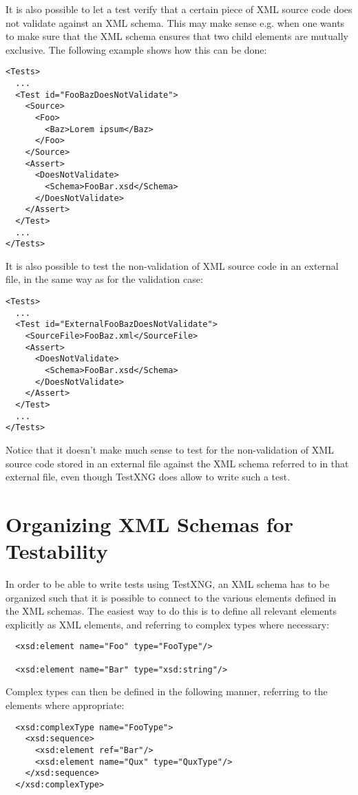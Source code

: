 It is also possible to let a test verify that a certain piece of XML source code does not validate against an XML schema. This may make sense e.g. when one wants to make sure that the XML schema ensures that two child elements are mutually exclusive. The following example shows how this can be done:
\begin{verbatim}
<Tests>
  ...
  <Test id="FooBazDoesNotValidate">
    <Source>
      <Foo>
        <Baz>Lorem ipsum</Baz>
      </Foo>
    </Source>
    <Assert>
      <DoesNotValidate>
        <Schema>FooBar.xsd</Schema>
      </DoesNotValidate>
    </Assert>
  </Test>
  ...
</Tests>
\end{verbatim}

It is also possible to test the non-validation of XML source code in an external file, in the same way as for the validation case:
\begin{verbatim}
<Tests>
  ...
  <Test id="ExternalFooBazDoesNotValidate">
    <SourceFile>FooBaz.xml</SourceFile>
    <Assert>
      <DoesNotValidate>
        <Schema>FooBar.xsd</Schema>
      </DoesNotValidate>
    </Assert>
  </Test>
  ...
</Tests>
\end{verbatim}

Notice that it doesn't make much sense to test for the non-validation of XML source code stored in an external file against the XML schema referred to in that external file, even though TestXNG does allow to write such a test.

\section{Organizing XML Schemas for Testability}

In order to be able to write tests using TestXNG, an XML schema has to be organized such that it is possible to connect to the various elements defined in the XML schemas. The easiest way to do this is to define all relevant elements explicitly as XML elements, and referring to complex types where necessary:
\begin{verbatim}
  <xsd:element name="Foo" type="FooType"/>

  <xsd:element name="Bar" type="xsd:string"/>
\end{verbatim}

Complex types can then be defined in the following manner, referring to the elements where appropriate:
\begin{verbatim}
  <xsd:complexType name="FooType">
    <xsd:sequence>
      <xsd:element ref="Bar"/>
      <xsd:element name="Qux" type="QuxType"/>  
    </xsd:sequence>
  </xsd:complexType>
\end{verbatim}

